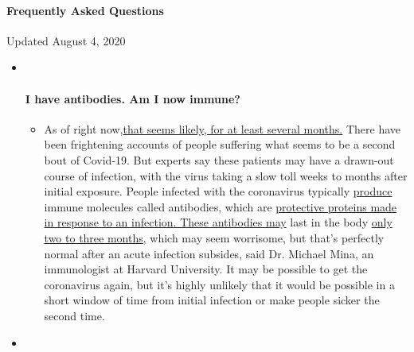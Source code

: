 \hypertarget{frequently-asked-questions}{%
\paragraph{Frequently Asked
Questions}\label{frequently-asked-questions}}

Updated August 4, 2020

\begin{itemize}
\item ~
  \hypertarget{i-have-antibodies-am-i-now-immune}{%
  \paragraph{I have antibodies. Am I now
  immune?}\label{i-have-antibodies-am-i-now-immune}}

  \begin{itemize}
  \tightlist
  \item
    As of right
    now,\href{https://www.nytimes3xbfgragh.onion/2020/07/22/health/covid-antibodies-herd-immunity.html?action=click\&pgtype=Article\&state=default\&region=MAIN_CONTENT_3\&context=storylines_faq}{that
    seems likely, for at least several months.} There have been
    frightening accounts of people suffering what seems to be a second
    bout of Covid-19. But experts say these patients may have a
    drawn-out course of infection, with the virus taking a slow toll
    weeks to months after initial exposure. People infected with the
    coronavirus typically
    \href{https://www.nature.com/articles/s41586-020-2456-9}{produce}
    immune molecules called antibodies, which are
    \href{https://www.nytimes3xbfgragh.onion/2020/05/07/health/coronavirus-antibody-prevalence.html?action=click\&pgtype=Article\&state=default\&region=MAIN_CONTENT_3\&context=storylines_faq}{protective
    proteins made in response to an
    infection}\href{https://www.nytimes3xbfgragh.onion/2020/05/07/health/coronavirus-antibody-prevalence.html?action=click\&pgtype=Article\&state=default\&region=MAIN_CONTENT_3\&context=storylines_faq}{.
    These antibodies may} last in the body
    \href{https://www.nature.com/articles/s41591-020-0965-6}{only two to
    three months}, which may seem worrisome, but that's perfectly normal
    after an acute infection subsides, said Dr. Michael Mina, an
    immunologist at Harvard University. It may be possible to get the
    coronavirus again, but it's highly unlikely that it would be
    possible in a short window of time from initial infection or make
    people sicker the second time.
  \end{itemize}
\item ~
  \hypertarget{im-a-small-business-owner-can-i-get-relief}{%
}
\end{itemize}
